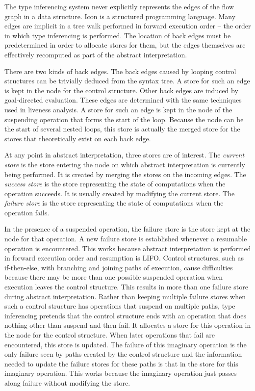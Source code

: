 The type inferencing system never explicitly represents the edges of
the flow graph in a data structure. Icon is a structured programming
language. Many edges are implicit in a tree walk performed in forward
execution order -- the order in which type inferencing is
performed. The location of back edges must be predetermined in order
to allocate stores for them, but the edges themselves are effectively
recomputed as part of the abstract interpretation.

There are two kinds of back edges. The back edges caused by looping
control structures can be trivially deduced from the syntax tree. A
store for such an edge is kept in the node for the control
structure. Other back edges are induced by goal-directed
evaluation. These edges are determined with the same techniques used
in liveness analysis. A store for such an edge is kept in the node of
the suspending operation that forms the start of the loop. Because the
node can be the start of several nested loops, this store is actually
the merged store for the stores that theoretically exist on each back
edge.

At any point in abstract interpretation, three stores are of
interest. The \textit{current store} is the store entering the node on
which abstract interpretation is currently being performed. It is
created by merging the stores on the incoming edges. The
\textit{success store} is the store representing the state of
computations when the operation succeeds. It is usually created by
modifying the current store. The \textit{failure store} is the store
representing the state of computations when the operation fails.

In the presence of a suspended operation, the failure store is the
store kept at the node for that operation. A new failure store is
established whenever a resumable operation is encountered. This works
because abstract interpretation is performed in forward execution
order and resumption is LIFO. Control structures, such as
if-then-else, with branching and joining paths of execution, cause
difficulties because there may be more than one possible suspended
operation when execution leaves the control structure. This results in
more than one failure store during abstract interpretation. Rather
than keeping multiple failure stores when such a control structure has
operations that suspend on multiple paths, type inferencing pretends
that the control structure ends with an operation that does nothing
other than suspend and then fail. It allocates a store for this
operation in the node for the control structure. When later operations
that fail are encountered, this store is updated. The failure of this
imaginary operation is the only failure seen by paths created by the
control structure and the information needed to update the failure
stores for these paths is that in the store for this imaginary
operation. This works because the imaginary operation just passes
along failure without modifying the store.


